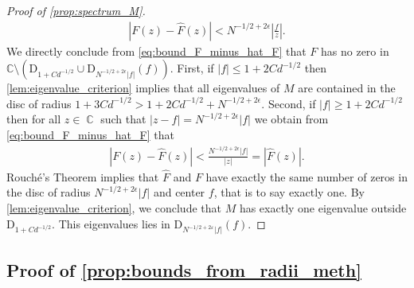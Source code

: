 \documentclass[10pt,a4paper]{amsart}
\DeclareMathOperator{\CC}{\mathbb{C}}
\newcommand{\abs}[1]{\left| #1 \right|}
\newcommand{\absN}[1]{| #1 |}
\newcommand{\C}{\mathbb{C}}
\newcommand{\eps}{\varepsilon}
\numberwithin{equation}{section}
\begin{document}
\begin{proof}[Proof of \cref{prop:spectrum_M}]
   \begin{align}\label{eq:bound_F_minus_hat_F} 
       \absN{F(z) - \widehat{F}(z)} < N^{-1/2 + 2\epsilon}\abs{\frac{f}{z}}.
   \end{align}
   We directly conclude from  
 \cref{eq:bound_F_minus_hat_F} that $F$ has no zero in    $\C \setminus ( \mathrm{D}_{1+ C d^{-1/2}} \cup \mathrm{D}_{N^{-1/2 + 2\epsilon}|f|}(f))$. First, if  $\abs{f}\le 1+ 2 Cd^{-1/2}$ then  \cref{lem:eigenvalue_criterion} implies that all eigenvalues of $M$ are contained in the disc of radius $1+ 3 Cd^{-1/2} > 1+ 2Cd^{-1/2} + N^{-1/2+ 2 \epsilon}$. 
 Second, if $\abs{f}\ge 1+ 2 Cd^{-1/2}$ then for all $z \in \CC$ such that $\abs{z-f} = N^{-1/2 + 2\epsilon}|f|$
 we obtain from \cref{eq:bound_F_minus_hat_F} that 
    \begin{align*}
       \absN{F(z) - \widehat{F}(z)} <\frac{N^{-1/2 + 2\epsilon}|f|}{\abs{z}} = \absN{\widehat{F}(z)}.
   \end{align*}
   Rouch{\'e}'s Theorem implies that $\widehat{F}$ and $F$ have exactly the same number of zeros in the disc of radius $N^{-1/2 + 2\epsilon}|f|$ and center $f$, that is to say exactly one. 
    By \cref{lem:eigenvalue_criterion}, we conclude that $M$ has 
   exactly one eigenvalue outside $\mathrm{D}_{1 + Cd ^{-1/2}}$. This eigenvalues lies in $\mathrm{D}_{ N^{-1/2 +2\eps}\abs{f}}(f)$.  
\end{proof}

\subsection{Proof of \cref{prop:bounds_from_radii_meth}}\label{section:proofbounds_from_radii_meth}
\end{document}
